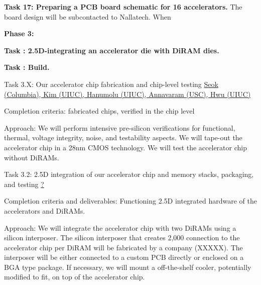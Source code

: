 \noindent
\textbf{Task 17: Preparing a PCB board schematic for 16 accelerators.}
The board design will be subcontacted to Nallatech.
When 


\noindent
\textbf{Phase 3:}

\noindent
\textbf{Task : 2.5D-integrating an accelerator die with DiRAM dies.}

\noindent
\textbf{Task : Build.}



Task 3.X: Our accelerator chip fabrication and chip-level testing \underline{Seok (Columbia), Kim (UIUC), Hanumolu (UIUC), Annavaram (USC), Hwu (UIUC)}

   Completion criteria: fabricated chips, verified in the chip level

   Approach: We will perform intensive pre-silicon verifications for functional, thermal, voltage integrity, noise, and testability aspects. We will tape-out the accelerator chip in a 28nm CMOS technology. We will test the accelerator chip without DiRAMs. 

Task 3.2: 2.5D integration of our accelerator chip and memory stacks, packaging, and testing \underline{?}

   Completion criteria and deliverables: Functioning 2.5D integrated hardware of the accelerators and DiRAMs. 

   Approach:  We will integrate the accelerator chip with two DiRAMs using a silicon interposer. The silicon interposer that creates 2,000 connection to the accelerator chip per DiRAM will be fabricated by a company (XXXXX). The interposer will be either connected to a custom PCB directly or enclosed on a BGA type package. If necessary, we will mount a off-the-shelf cooler, potentially modified to fit, on top of the accelerator chip. 
